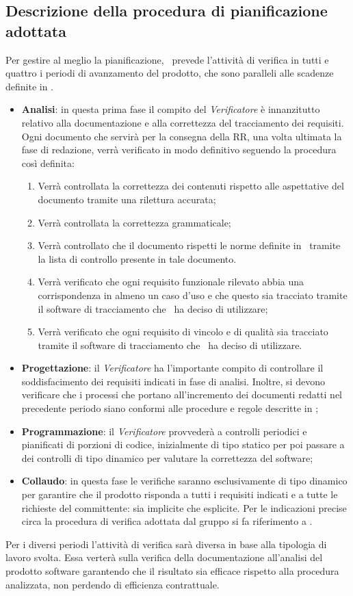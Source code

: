 \subsection{Descrizione della procedura di pianificazione adottata}
Per gestire al meglio la pianificazione, \gruppo ~prevede l'attività di verifica in tutti e quattro i periodi di avanzamento del prodotto, che sono paralleli alle scadenze definite in \infoPDP.
\begin{itemize}
\item \textbf{Analisi}: in questa prima fase il compito del \textit{Verificatore} è innanzitutto relativo alla documentazione e alla correttezza del tracciamento dei requisiti. Ogni documento che servirà per la consegna della RR, una volta ultimata la fase di redazione, verrà verificato in modo definitivo seguendo la procedura così definita:
\begin{enumerate}
\item Verrà controllata la correttezza dei contenuti rispetto alle aspettative del documento tramite una rilettura accurata;
\item Verrà controllata la correttezza grammaticale;
\item Verrà controllato che il documento rispetti le norme definite in \infoNDP ~tramite la lista di controllo presente in tale documento.
\item Verrà verificato che ogni requisito funzionale rilevato abbia una corrispondenza in almeno un caso d'uso e che questo sia tracciato tramite il software di tracciamento che \gruppo ~ha deciso di utilizzare;
\item Verrà verificato che ogni requisito di vincolo e di qualità sia tracciato tramite il software di tracciamento che \gruppo ~ha deciso di utilizzare.
\end{enumerate}
\item \textbf{Progettazione}: il \textit{Verificatore} ha l'importante compito di controllare il soddisfacimento dei requisiti indicati in fase di analisi. Inoltre, si devono verificare che i processi che portano all'incremento dei documenti redatti nel precedente periodo siano conformi alle procedure e regole descritte in \infoNDP;
\item \textbf{Programmazione}: il \textit{Verificatore} provvederà a controlli periodici e pianificati di porzioni di codice, inizialmente di tipo statico per poi passare a dei controlli di tipo dinamico per valutare la correttezza del software;
\item \textbf{Collaudo}: in questa fase le verifiche saranno esclusivamente di tipo dinamico per garantire che il prodotto risponda a tutti i requisiti indicati e a tutte le richieste del committente: sia implicite che esplicite.
Per le indicazioni precise circa la procedura di verifica adottata dal gruppo si fa riferimento a \infoNDP.
\end{itemize}
Per i diversi periodi l'attività di verifica sarà diversa in base alla tipologia di lavoro svolta. Essa verterà sulla verifica della documentazione all'analisi del prodotto software garantendo che il risultato sia efficace rispetto alla procedura analizzata, non perdendo di efficienza contrattuale. 
